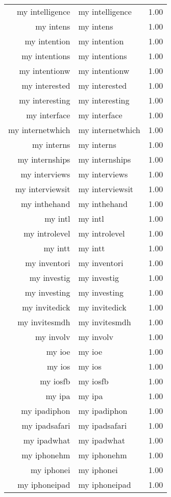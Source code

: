 \begin{table}[ht]
\begin{tabular}{rlr}
  my intelligence & my intelligence & 1.00 \\ 
  my intens & my intens & 1.00 \\ 
  my intention & my intention & 1.00 \\ 
  my intentions & my intentions & 1.00 \\ 
  my intentionw & my intentionw & 1.00 \\ 
  my interested & my interested & 1.00 \\ 
  my interesting & my interesting & 1.00 \\ 
  my interface & my interface & 1.00 \\ 
  my internetwhich & my internetwhich & 1.00 \\ 
  my interns & my interns & 1.00 \\ 
  my internships & my internships & 1.00 \\ 
  my interviews & my interviews & 1.00 \\ 
  my interviewsit & my interviewsit & 1.00 \\ 
  my inthehand & my inthehand & 1.00 \\ 
  my intl & my intl & 1.00 \\ 
  my introlevel & my introlevel & 1.00 \\ 
  my intt & my intt & 1.00 \\ 
  my inventori & my inventori & 1.00 \\ 
  my investig & my investig & 1.00 \\ 
  my investing & my investing & 1.00 \\ 
  my invitedick & my invitedick & 1.00 \\ 
  my invitesmdh & my invitesmdh & 1.00 \\ 
  my involv & my involv & 1.00 \\ 
  my ioe & my ioe & 1.00 \\ 
  my ios & my ios & 1.00 \\ 
  my iosfb & my iosfb & 1.00 \\ 
  my ipa & my ipa & 1.00 \\ 
  my ipadiphon & my ipadiphon & 1.00 \\ 
  my ipadsafari & my ipadsafari & 1.00 \\ 
  my ipadwhat & my ipadwhat & 1.00 \\ 
  my iphonehm & my iphonehm & 1.00 \\ 
  my iphonei & my iphonei & 1.00 \\ 
  my iphoneipad & my iphoneipad & 1.00 \\ 

\end{tabular}
\end{table}
